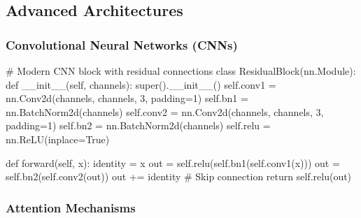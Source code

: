 \documentclass[
  11pt,
  letterpaper,
]{article}
\newenvironment{Shaded}{}{}
\newcommand{\BuiltInTok}[1]{\textcolor[rgb]{0.84,0.23,0.29}{#1}}
\newcommand{\CommentTok}[1]{\textcolor[rgb]{0.42,0.45,0.49}{#1}}
\newcommand{\ControlFlowTok}[1]{\textcolor[rgb]{0.84,0.23,0.29}{#1}}
\newcommand{\DecValTok}[1]{\textcolor[rgb]{0.00,0.36,0.77}{#1}}
\newcommand{\FunctionTok}[1]{\textcolor[rgb]{0.44,0.26,0.76}{#1}}
\newcommand{\KeywordTok}[1]{\textcolor[rgb]{0.84,0.23,0.29}{#1}}
\newcommand{\NormalTok}[1]{\textcolor[rgb]{0.14,0.16,0.18}{#1}}
\newcommand{\OperatorTok}[1]{\textcolor[rgb]{0.14,0.16,0.18}{#1}}
\newcommand{\VariableTok}[1]{\textcolor[rgb]{0.89,0.38,0.04}{#1}}
\begin{document}
\subsection{Advanced Architectures}\label{advanced-architectures}

\subsubsection{Convolutional Neural Networks
(CNNs)}\label{convolutional-neural-networks-cnns}

\begin{Shaded}
\begin{Highlighting}[]
\CommentTok{\# Modern CNN block with residual connections}
\KeywordTok{class}\NormalTok{ ResidualBlock(nn.Module):}
    \KeywordTok{def} \FunctionTok{\_\_init\_\_}\NormalTok{(}\VariableTok{self}\NormalTok{, channels):}
        \BuiltInTok{super}\NormalTok{().}\FunctionTok{\_\_init\_\_}\NormalTok{()}
        \VariableTok{self}\NormalTok{.conv1 }\OperatorTok{=}\NormalTok{ nn.Conv2d(channels, channels, }\DecValTok{3}\NormalTok{, padding}\OperatorTok{=}\DecValTok{1}\NormalTok{)}
        \VariableTok{self}\NormalTok{.bn1 }\OperatorTok{=}\NormalTok{ nn.BatchNorm2d(channels)}
        \VariableTok{self}\NormalTok{.conv2 }\OperatorTok{=}\NormalTok{ nn.Conv2d(channels, channels, }\DecValTok{3}\NormalTok{, padding}\OperatorTok{=}\DecValTok{1}\NormalTok{)}
        \VariableTok{self}\NormalTok{.bn2 }\OperatorTok{=}\NormalTok{ nn.BatchNorm2d(channels)}
        \VariableTok{self}\NormalTok{.relu }\OperatorTok{=}\NormalTok{ nn.ReLU(inplace}\OperatorTok{=}\VariableTok{True}\NormalTok{)}
        
    \KeywordTok{def}\NormalTok{ forward(}\VariableTok{self}\NormalTok{, x):}
\NormalTok{        identity }\OperatorTok{=}\NormalTok{ x}
\NormalTok{        out }\OperatorTok{=} \VariableTok{self}\NormalTok{.relu(}\VariableTok{self}\NormalTok{.bn1(}\VariableTok{self}\NormalTok{.conv1(x)))}
\NormalTok{        out }\OperatorTok{=} \VariableTok{self}\NormalTok{.bn2(}\VariableTok{self}\NormalTok{.conv2(out))}
\NormalTok{        out }\OperatorTok{+=}\NormalTok{ identity  }\CommentTok{\# Skip connection}
        \ControlFlowTok{return} \VariableTok{self}\NormalTok{.relu(out)}
\end{Highlighting}
\end{Shaded}

\subsubsection{Attention Mechanisms}\label{attention-mechanisms}
\end{document}
